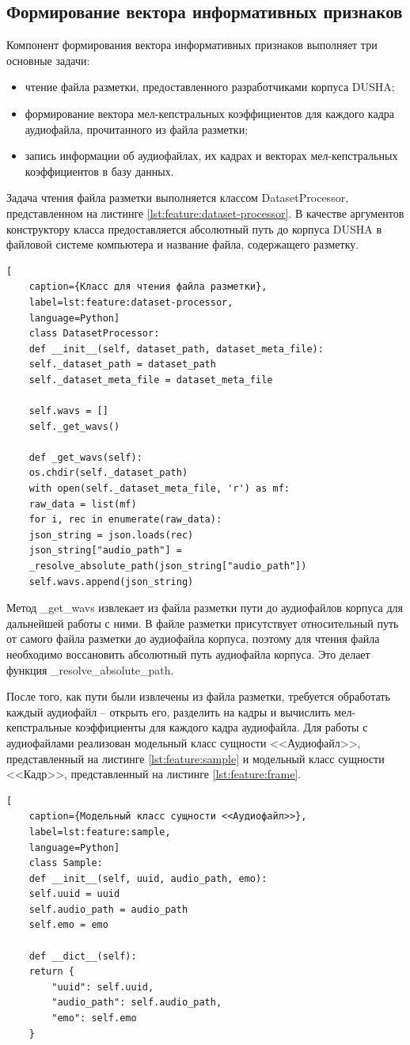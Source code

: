 \subsection{Формирование вектора информативных признаков}
Компонент формирования вектора информативных признаков выполняет три основные задачи:
\begin{itemize}
	\item чтение файла разметки, предоставленного разработчиками корпуса DUSHA;
	\item формирование вектора мел-кепстральных коэффициентов для каждого кадра аудиофайла, прочитанного из файла разметки;
	\item запись информации об аудиофайлах, их кадрах и векторах мел-кепстральных коэффициентов в базу данных.
\end{itemize}
Задача чтения файла разметки выполняется классом DatasetProcessor, представленном на листинге \ref{lst:feature:dataset-processor}. В качестве аргументов конструктору класса предоставляется абсолютный путь до корпуса DUSHA в файловой системе компьютера и название файла, содержащего разметку.
\begin{lstlisting}[
	caption={Класс для чтения файла разметки},
	label=lst:feature:dataset-processor,
	language=Python]
	class DatasetProcessor:
	def __init__(self, dataset_path, dataset_meta_file):
	self._dataset_path = dataset_path
	self._dataset_meta_file = dataset_meta_file
	
	self.wavs = []
	self._get_wavs()
	
	def _get_wavs(self):
	os.chdir(self._dataset_path)
	with open(self._dataset_meta_file, 'r') as mf:
	raw_data = list(mf)
	for i, rec in enumerate(raw_data):
	json_string = json.loads(rec)
	json_string["audio_path"] =
	_resolve_absolute_path(json_string["audio_path"])
	self.wavs.append(json_string)
\end{lstlisting}
Метод \_get\_wavs извлекает из файла разметки пути до аудиофайлов корпуса для дальнейшей работы с ними. В файле разметки присутствует относительный путь от самого файла разметки до аудиофайла корпуса, поэтому для чтения файла необходимо воссановить абсолютный путь аудиофайла корпуса. Это делает функция \_resolve\_absolute\_path.

После того, как пути были извлечены из файла разметки, требуется обработать каждый аудиофайл -- открыть его, разделить на кадры и вычислить мел-кепстральные коэффициенты для каждого кадра аудиофайла. Для работы с аудиофайлами реализован модельный класс сущности <<Аудиофайл>>, представленный на листинге \ref{lst:feature:sample} и модельный класс сущности <<Кадр>>, представленный на листинге \ref{lst:feature:frame}.
\begin{lstlisting}[
	caption={Модельный класс сущности <<Аудиофайл>>},
	label=lst:feature:sample,
	language=Python]
	class Sample:
	def __init__(self, uuid, audio_path, emo):
	self.uuid = uuid
	self.audio_path = audio_path
	self.emo = emo
	
	def __dict__(self):
	return {
		"uuid": self.uuid,
		"audio_path": self.audio_path,
		"emo": self.emo
	}
\end{lstlisting}

